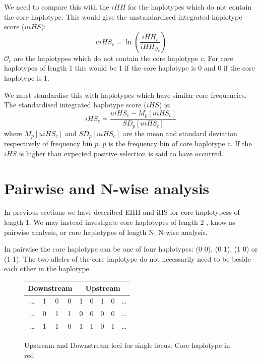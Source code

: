 \documentclass[a4paper,12pt]{report}
\begin{document}
We need to compare this with the $iHH$ for the haplotypes which do not contain the core haplotype. This would give the unstandardised integrated haplotype score ($uiHS$):
\begin{equation}
uiHS_c = \ln\left(\dfrac{iHH_c}{iHH_{\mathcal{O}_c}}\right)
\end{equation}
$\mathcal{O}_c$ are the haplotypes which do not contain the core haplotype $c$. For core haplotypes of length 1 this would be 1 if the core haplotype is 0 and 0 if the core haplotype is 1.

We must standardise this with haplotypes which have similar core frequencies. The standardised integrated haplotype score ($iHS$) is:
\begin{equation}
iHS_c = \dfrac{uiHS_c-M_p[uiHS_c]}{SD_p[uiHS_c]}
\end{equation}
where $M_p[uiHS_c]$ and $SD_p[uiHS_c]$ are the mean and standard deviation respectively of frequency bin $p$.\cite{iHS}  $p$ is the frequency bin of core haplotype c. If the $iHS$ is higher than expected positive selection is said to have occurred. 
\section{Pairwise and N-wise analysis}
In previous sections we have described EHH and iHS for core haplotypess of length 1. We may instead investigate core haplotypes of length 2 \cite{hapbin}, know as pairwise analysis, or core haplotypes of length N, N-wise analysis.

In pairwise the core haplotype can be one of four haplotypes: (0 0), (0 1), (1 0) or (1 1). The two alleles of the core haplotype do not necessarily need to be beside each other in the haplotype.

\begin{figure}[h!]
\begin{center}
  \begin{tabular}{ | r c c c | c | c c c l |}
    \multicolumn{4}{c}{Downstream} & \multicolumn{5}{c}{Upstream} \\
    \hline
    \ldots & 1 & 0 & 0 & \color{red} 1 & 0 & 1 & 0 & \ldots \\
    \ldots & 0 & 1 & 1 & \color{red} 0 & 0 & 0 & 0 & \ldots \\
    \ldots & 1 & 1 & 0 & \color{red} 1 & 1 & 0 & 1 & \ldots \\
    \hline
  \end{tabular}
    \caption{Upstream and Downstream loci for single locus. Core haplotype in red}
\end{center}
\end{figure}
\end{document}
